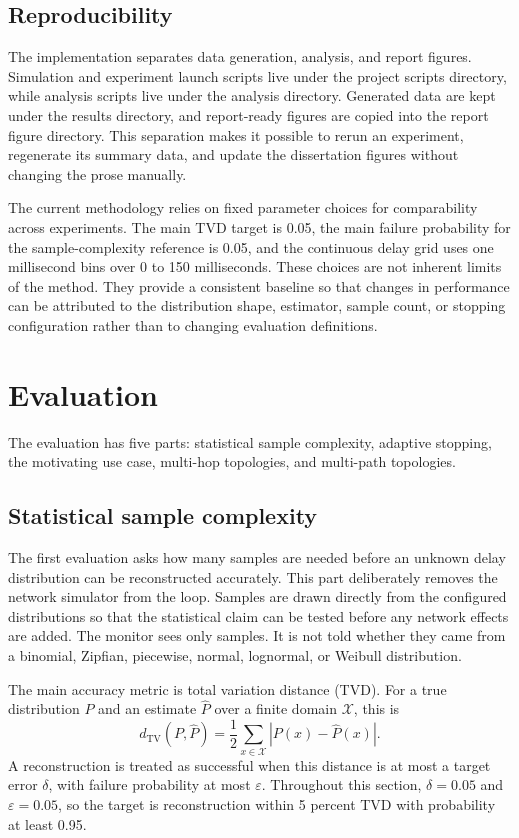 \documentclass[a4paper,11pt]{report}
\begin{document}
\section{Reproducibility}
\label{sec:method-reproducibility}

The implementation separates data generation, analysis, and report figures. Simulation and experiment launch scripts live under the project scripts directory, while analysis scripts live under the analysis directory. Generated data are kept under the results directory, and report-ready figures are copied into the report figure directory. This separation makes it possible to rerun an experiment, regenerate its summary data, and update the dissertation figures without changing the prose manually.

The current methodology relies on fixed parameter choices for comparability across experiments. The main TVD target is 0.05, the main failure probability for the sample-complexity reference is 0.05, and the continuous delay grid uses one millisecond bins over 0 to 150 milliseconds. These choices are not inherent limits of the method. They provide a consistent baseline so that changes in performance can be attributed to the distribution shape, estimator, sample count, or stopping configuration rather than to changing evaluation definitions.

\chapter{Evaluation}

The evaluation has five parts: statistical sample complexity, adaptive stopping, the motivating use case, multi-hop topologies, and multi-path topologies.

\section{Statistical sample complexity}
\label{sec:eval-statistical}

The first evaluation asks how many samples are needed before an unknown delay distribution can be reconstructed accurately. This part deliberately removes the network simulator from the loop. Samples are drawn directly from the configured distributions so that the statistical claim can be tested before any network effects are added. The monitor sees only samples. It is not told whether they came from a binomial, Zipfian, piecewise, normal, lognormal, or Weibull distribution.

The main accuracy metric is total variation distance (TVD). For a true distribution \(P\) and an estimate \(\widehat{P}\) over a finite domain \(\mathcal{X}\), this is
\[
d_{\mathrm{TV}}(P,\widehat{P}) =
\frac{1}{2}\sum_{x \in \mathcal{X}} |P(x)-\widehat{P}(x)|.
\]
A reconstruction is treated as successful when this distance is at most a target error \(\delta\), with failure probability at most \(\varepsilon\). Throughout this section, \(\delta=0.05\) and \(\varepsilon=0.05\), so the target is reconstruction within 5 percent TVD with probability at least 0.95.
\end{document}
